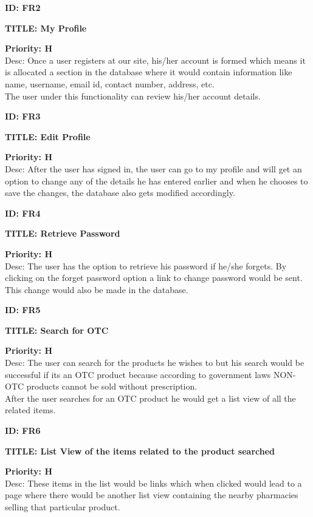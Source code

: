 \documentclass{scrreprt}
\begin{document}
\item \textbf{ID: FR2}
\item \textbf{TITLE: My Profile}
\item \textbf{Priority: H}\\
Desc: Once a user registers at our site, his/her account is formed which means it is allocated a section in the database where it would contain information like name, username, email id, contact number, address, etc.\\
The user under this functionality can review his/her account details.\\

\item \textbf{ID: FR3}
\item \textbf{TITLE: Edit Profile}
\item \textbf{Priority: H}\\
Desc:  After the user has signed in, the user can go to my profile and will get an option to change any of the details he has entered earlier  and when he chooses to save the changes, the database also gets modified accordingly.\\

\item \textbf{ID: FR4}
\item \textbf{TITLE: Retrieve Password}
\item \textbf{Priority: H}\\
Desc: The user has the option to retrieve his password if he/she forgets. By clicking on the forget password option a link to change password would be sent. This change would also be made in the database.\\

\item \textbf{ID: FR5}
\item \textbf{TITLE: Search for OTC}
\item \textbf{Priority: H}\\
Desc: The user can search for the products he wishes to but his search would be successful if its an OTC product because according to government laws NON-OTC products cannot be sold without prescription.\\
After the user searches for an OTC product he would get a list view of all the related items.\\

\item \textbf{ID: FR6}
\item \textbf{TITLE: List View of the items related to the product searched}
\item \textbf{Priority: H}\\
Desc: These items in the list would be links which when clicked would lead to a page where there would be another list view containing the nearby pharmacies selling that particular product.\\
\end{document}
